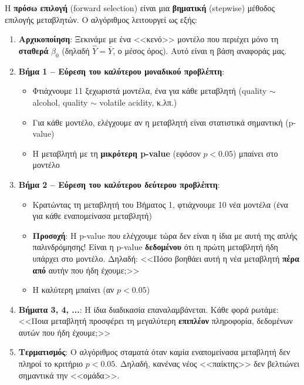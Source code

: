 \documentclass[12pt,a4paper]{article}
\begin{document}
\begin{theorybox}
Η \textbf{πρόσω επιλογή} (forward selection) είναι μια \textbf{βηματική} (stepwise) μέθοδος επιλογής μεταβλητών. Ο αλγόριθμος λειτουργεί ως εξής:

\begin{enumerate}
    \item \textbf{Αρχικοποίηση}: Ξεκινάμε με ένα <<κενό>> μοντέλο που περιέχει μόνο τη \textbf{σταθερά} $\beta_0$ (δηλαδή $\hat{Y} = \bar{Y}$, ο μέσος όρος). Αυτό είναι η βάση αναφοράς μας.

    \item \textbf{Βήμα 1 -- Εύρεση του καλύτερου μοναδικού προβλέπτη}:
    \begin{itemize}
        \item Φτιάχνουμε 11 ξεχωριστά μοντέλα, ένα για κάθε μεταβλητή (quality $\sim$ alcohol, quality $\sim$ volatile acidity, κ.λπ.)
        \item Για κάθε μοντέλο, ελέγχουμε αν η μεταβλητή είναι στατιστικά σημαντική (p-value)
        \item Η μεταβλητή με τη \textbf{μικρότερη p-value} (εφόσον $p < 0.05$) μπαίνει στο μοντέλο
    \end{itemize}

    \item \textbf{Βήμα 2 -- Εύρεση του καλύτερου δεύτερου προβλέπτη}:
    \begin{itemize}
        \item Κρατώντας τη μεταβλητή του Βήματος 1, φτιάχνουμε 10 νέα μοντέλα (ένα για κάθε εναπομείνασα μεταβλητή)
        \item \textbf{Προσοχή}: Η p-value που ελέγχουμε τώρα δεν είναι η ίδια με αυτή της απλής παλινδρόμησης! Είναι η p-value \textbf{δεδομένου} ότι η πρώτη μεταβλητή ήδη υπάρχει στο μοντέλο. Δηλαδή: <<Πόσο βοηθάει αυτή η νέα μεταβλητή \textbf{πέρα από} αυτήν που ήδη έχουμε;>>
        \item Η καλύτερη μπαίνει (αν $p < 0.05$)
    \end{itemize}

    \item \textbf{Βήματα 3, 4, ...}: Η ίδια διαδικασία επαναλαμβάνεται. Κάθε φορά ρωτάμε: <<Ποια μεταβλητή προσφέρει τη μεγαλύτερη \textbf{επιπλέον} πληροφορία, δεδομένων αυτών που ήδη έχουμε;>>

    \item \textbf{Τερματισμός}: Ο αλγόριθμος σταματά όταν καμία εναπομείνασα μεταβλητή δεν πληροί το κριτήριο $p < 0.05$. Δηλαδή, κανένας νέος <<παίκτης>> δεν βελτιώνει σημαντικά την <<ομάδα>>.
\end{enumerate}
\end{theorybox}
\end{document}
